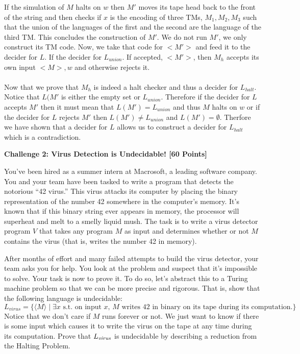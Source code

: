 \documentclass[12pt]{article}
\newcommand{\Problem}[3]{\mbox{} \newline \noindent \textbf{\textbf{Challenge #1: #2 [#3 Points] \\ }}}
\begin{document}
\begin{enumerate}
	If the simulation of $M$ halts on $w$ then $M'$ moves its tape head back to the front of the string and then checks if $x$ is the encoding of three TMs, $M_1, M_2, M_3$ such that the union of the languages of the first and the second are the language of the third TM. This concludes the construction of $M'$. We do not run $M'$, we only construct its TM code. Now, we take that code for $<M'>$ and feed it to the decider for $L$. If the decider for $L_{union}$. If accepted, $<M'>$, then $M_h$ accepts its own input $<M>, w$ and otherwise rejects it.\\\\
	Now that we prove that $M_h$ is indeed a halt checker and thus a decider for $L_{halt}$. Notice that $L(M'$ is either the empty set or $L_{union}$. Therefore if the decider for $L$ accepts $M'$ then it must mean that $L(M') = L_{union}$ and thus $M$ halts on $w$ or if the decider for $L$ rejects $M'$ then $L(M') \neq L_{union}$ and $L(M') = \emptyset$. Therfore we have shown that a decider for $L$ allows us to construct a decider for $L_{halt}$ which is a contradiction.
\end{enumerate}

\Problem{2}{Virus Detection is Undecidable!}{60}

You've been hired as a summer intern at Macrosoft, a leading software company. You and your team have been tasked to write a program that detects the notorious ``42 virus.''  This virus attacks its computer by placing the binary representation of the number 42 somewhere in the computer's memory. It's known that if this binary string ever appears in memory, the processor will superheat and melt to a smelly liquid mush.  The task is to write a virus detector program $V$ that takes any program $M$ as input and determines whether or not $M$ contains the virus (that is, writes the number 42 in memory).

After months of effort and many failed attempts to build the virus detector, your team asks you for help. You look at the problem and suspect that it's impossible to solve. Your task is now to prove it.  To do so, let's abstract this to a Turing machine problem so that we can be more precise and rigorous. That is, show that the following language is undecidable:
\small
\[
    L_{virus} = \{ \langle M\rangle \mid \mbox{$\exists x$ s.t.\ on input $x$, $M$ writes 42 in binary on its tape during its computation.} \}
\]
\normalsize
Notice that we don't care if $M$ runs forever or not. We just want to know if there is some input which causes it to write the virus on the tape at any time during its computation. 
Prove that $L_\emph{virus}$ is undecidable by describing a reduction from the Halting Problem.
\end{document}
